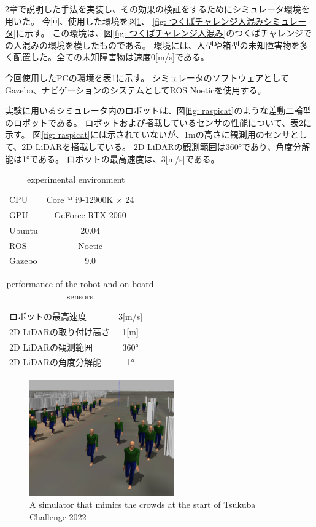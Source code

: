 \documentclass{jarticle}
\begin{document}
2章で説明した手法を実装し、その効果の検証をするためにシミュレータ環境を用いた。
今回、使用した環境を図\ref{fig: 人混みガゼボ}、
\ref{fig: つくばチャレンジ人混みシミュレータ}に示す。
この環境は、図\ref{fig: つくばチャレンジ人混み}のつくばチャレンジでの人混みの環境を模したものである。
環境には、人型や箱型の未知障害物を多く配置した。全ての未知障害物は速度0[m/s]である。

今回使用したPCの環境を表\ref{table: PCの環境}に示す。
シミュレータのソフトウェアとしてGazebo、ナビゲーションのシステムとしてROS Noeticを使用する。

実験に用いるシミュレータ内のロボットは、図\ref{fig: raspicat}のような差動二輪型のロボットである。
ロボットおよび搭載しているセンサの性能について、表\ref{table: ロボットおよび搭載しているセンサの性能}に示す。
図\ref{fig: raspicat}には示されていないが、1mの高さに観測用のセンサとして、2D LiDARを搭載している。
2D LiDARの観測範囲は360°であり、角度分解能は1°である。
ロボットの最高速度は、3[m/s]である。

\begin{table}[hbtp]
  \caption{experimental environment}
  \label{table: PCの環境}
  \centering
  \begin{tabular}{lcr}
    \hline
    CPU & Core™ i9-12900K × 24 \\
    GPU & GeForce RTX 2060 \\
    Ubuntu & 20.04 \\
    ROS  & Noetic \\
    Gazebo  &  9.0 \\
    \hline
  \end{tabular}
\end{table}

\begin{table}[hbtp]
  \caption{performance of the robot and on-board sensors}
  \label{table: ロボットおよび搭載しているセンサの性能}
  \centering
  \begin{tabular}{lcr}
    \hline
    ロボットの最高速度 & 3[m/s] \\
    2D LiDARの取り付け高さ & 1[m] \\
    2D LiDARの観測範囲 & 360° \\
    2D LiDARの角度分解能 & 1° \\
    \hline
  \end{tabular}
\end{table}

\begin{figure}[htbp]
  \centering
   \includegraphics[height=50mm]{fig/hitogomi_gazebo.png}
   \vspace*{-4mm}
   \caption{A simulator that mimics the crowds at the start of Tsukuba Challenge 2022}
   \label{fig: 人混みガゼボ}
\end{figure}
\end{document}
